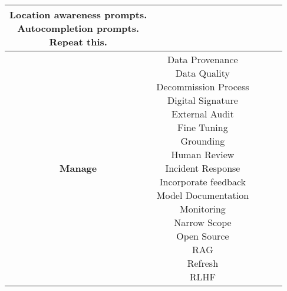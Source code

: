 \documentclass[fleqn]{article}
\begin{document}
\begin{landscape}
\begin{table}[H]
\begin{tabular}{|c|c|c|c|c|}
{			\textbullet\hspace{3pt} Location awareness prompts.\\ 	
			\textbullet\hspace{3pt} Autocompletion prompts.\\ 	
			\textbullet\hspace{3pt} Repeat this. 	\\
		}
		\\
		\hline		
		\textbf{Manage} &  \makecell[l]{
			\textbullet\hspace{3pt} Data Provenance\\ 	
			\textbullet\hspace{3pt} Data Quality\\ 	
			\textbullet\hspace{3pt} Decommission Process\\ 	
			\textbullet\hspace{3pt} Digital Signature\\ 	
			\textbullet\hspace{3pt} External Audit\\ 	
			\textbullet\hspace{3pt} Fine Tuning\\ 	
			\textbullet\hspace{3pt} Grounding\\ 	
			\textbullet\hspace{3pt} Human Review \\ 	
			\textbullet\hspace{3pt} Incident Response\\ 	
			\textbullet\hspace{3pt} Incorporate feedback \\ 	
			\textbullet\hspace{3pt} Model Documentation \\ 	
			\textbullet\hspace{3pt} Monitoring\\ 
			\textbullet\hspace{3pt} Narrow Scope\\ 
		 	\textbullet\hspace{3pt} Open Source\\ 		
			\textbullet\hspace{3pt} RAG\\ 	
			\textbullet\hspace{3pt} Refresh\\ 	
			\textbullet\hspace{3pt} RLHF\\ 	
}
\end{tabular}
\end{table}
\end{landscape}
\end{document}
